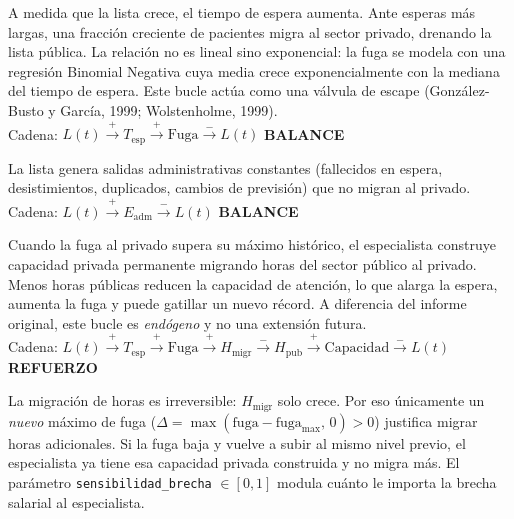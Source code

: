 \documentclass[12pt,a4paper]{article}
\begin{document}
\begin{description}[leftmargin=1cm,style=nextline]
  \item[\textcolor{verdeDS}{\textbf{B1 — Balance: Fuga al Sector Privado}}]
    A medida que la lista crece, el tiempo de espera aumenta. Ante esperas más largas, una fracción creciente de pacientes migra al sector privado, drenando la lista pública. La relación no es lineal sino exponencial: la fuga se modela con una regresión Binomial Negativa cuya media crece exponencialmente con la mediana del tiempo de espera. Este bucle actúa como una válvula de escape (González-Busto y García, 1999; Wolstenholme, 1999).\\
    Cadena: $L(t) \overset{+}{\to} T_{\text{esp}} \overset{+}{\to} \text{Fuga} \overset{-}{\to} L(t)$ \quad\textbf{BALANCE}

  \item[\textcolor{verdeDS}{\textbf{B2 — Balance: Drenaje Administrativo}}]
    La lista genera salidas administrativas constantes (fallecidos en espera, desistimientos, duplicados, cambios de previsión) que no migran al privado.\\
    Cadena: $L(t) \overset{+}{\to} E_{\text{adm}} \overset{-}{\to} L(t)$ \quad\textbf{BALANCE}

  \item[\textcolor{rojoDS}{\textbf{R1 — Refuerzo: Espiral de Erosión de Capacidad (Deadly Spiral)}}]
    Cuando la fuga al privado supera su máximo histórico, el especialista construye capacidad privada permanente migrando horas del sector público al privado. Menos horas públicas reducen la capacidad de atención, lo que alarga la espera, aumenta la fuga y puede gatillar un nuevo récord. A diferencia del informe original, este bucle es \emph{endógeno} y no una extensión futura.\\
    Cadena: $L(t) \overset{+}{\to} T_{\text{esp}} \overset{+}{\to} \text{Fuga} \overset{+}{\to} H_{\text{migr}} \overset{-}{\to} H_{\text{pub}} \overset{+}{\to} \text{Capacidad} \overset{-}{\to} L(t)$ \quad\textbf{REFUERZO}
\end{description}

\begin{tcolorbox}[colback=rojoDS!5,colframe=rojoDS!60,fonttitle=\bfseries,
  title=Lógica de récord del bucle R1]
La migración de horas es irreversible: $H_{\text{migr}}$ solo crece. Por eso únicamente un \emph{nuevo} máximo de fuga ($\Delta = \max(\text{fuga} - \text{fuga}_{\max},\,0) > 0$) justifica migrar horas adicionales. Si la fuga baja y vuelve a subir al mismo nivel previo, el especialista ya tiene esa capacidad privada construida y no migra más. El parámetro \texttt{sensibilidad\_brecha} $\in[0,1]$ modula cuánto le importa la brecha salarial al especialista.
\end{tcolorbox}
\end{document}

